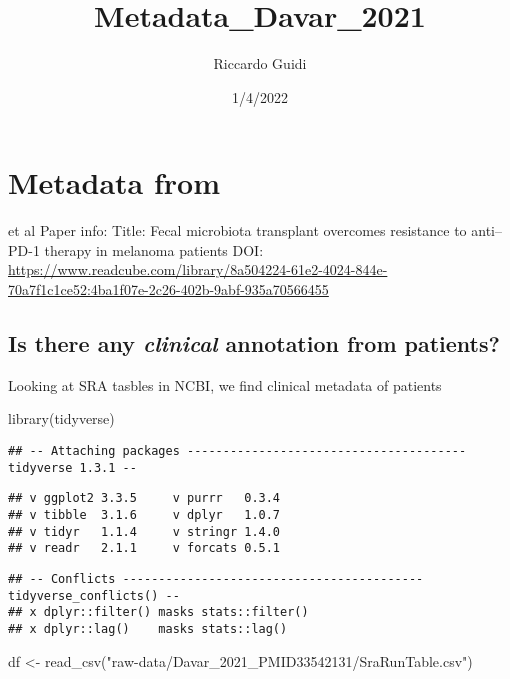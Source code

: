 \documentclass[
]{article}
\title{Metadata\_Davar\_2021}
\author{Riccardo Guidi}
\date{1/4/2022}
\newenvironment{Shaded}{\begin{snugshade}}{\end{snugshade}}
\newcommand{\FunctionTok}[1]{\textcolor[rgb]{0.00,0.00,0.00}{#1}}
\newcommand{\NormalTok}[1]{#1}
\newcommand{\OtherTok}[1]{\textcolor[rgb]{0.56,0.35,0.01}{#1}}
\newcommand{\StringTok}[1]{\textcolor[rgb]{0.31,0.60,0.02}{#1}}
\begin{document}
\maketitle

\hypertarget{metadata-from}{%
\section{Metadata from}\label{metadata-from}}

et al Paper info: Title: Fecal microbiota transplant overcomes
resistance to anti--PD-1 therapy in melanoma patients DOI:
\url{https://www.readcube.com/library/8a504224-61e2-4024-844e-70a7f1c1ce52:4ba1f07e-2c26-402b-9abf-935a70566455}

\hypertarget{is-there-any-clinical-annotation-from-patients}{%
\subsection{\texorpdfstring{Is there any \emph{clinical} annotation from
patients?}{Is there any clinical annotation from patients?}}\label{is-there-any-clinical-annotation-from-patients}}

Looking at SRA tasbles in NCBI, we find clinical metadata of patients

\begin{Shaded}
\begin{Highlighting}[]
\FunctionTok{library}\NormalTok{(tidyverse)}
\end{Highlighting}
\end{Shaded}

\begin{verbatim}
## -- Attaching packages --------------------------------------- tidyverse 1.3.1 --
\end{verbatim}

\begin{verbatim}
## v ggplot2 3.3.5     v purrr   0.3.4
## v tibble  3.1.6     v dplyr   1.0.7
## v tidyr   1.1.4     v stringr 1.4.0
## v readr   2.1.1     v forcats 0.5.1
\end{verbatim}

\begin{verbatim}
## -- Conflicts ------------------------------------------ tidyverse_conflicts() --
## x dplyr::filter() masks stats::filter()
## x dplyr::lag()    masks stats::lag()
\end{verbatim}

\begin{Shaded}
\begin{Highlighting}[]
\NormalTok{df }\OtherTok{\textless{}{-}} \FunctionTok{read\_csv}\NormalTok{(}\StringTok{"raw{-}data/Davar\_2021\_PMID33542131/SraRunTable.csv"}\NormalTok{)}
\end{Highlighting}
\end{Shaded}
\end{document}
